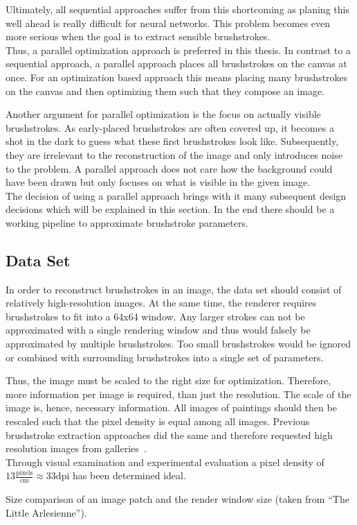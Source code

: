 Ultimately, all sequential approaches suffer from this shortcoming as planing this well ahead is really difficult for neural networks.
This problem becomes even more serious when the goal is to extract sensible brushstrokes.\\
Thus, a parallel optimization approach is preferred in this thesis.
In contrast to a sequential approach, a parallel approach places all brushstrokes on the canvas at once.
For an optimization based approach this means placing many brushstrokes on the canvas and then optimizing them such that they compose an image.

Another argument for parallel optimization is the focus on actually visible brushstrokes.
As early-placed brushstrokes are often covered up, it becomes a shot in the dark to guess what these first brushstrokes look like.
Subsequently, they are irrelevant to the reconstruction of the image and only introduces noise to the problem.
A parallel approach does not care how the background could have been drawn but only focuses on what is visible in the given image.\\

The decision of using a parallel approach brings with it many subsequent design decisions which will be explained in this section.
In the end there should be a working pipeline to approximate brushstroke parameters.

\subsection{Data Set}
In order to reconstruct brushstrokes in an image, the data set should consist of relatively high-resolution images.
At the same time, the renderer requires brushstrokes to fit into a 64x64 window.
Any larger strokes can not be approximated with a single rendering window and thus would falsely be approximated by multiple brushstrokes.
Too small brushstrokes would be ignored or combined with surrounding brushstrokes into a single set of parameters.

Thus, the image must be scaled to the right size for optimization.
Therefore, more information per image is required, than just the resolution.
The scale of the image is, hence, necessary information.
All images of paintings should then be rescaled such that the pixel density is equal among all images.
Previous brushstroke extraction approaches did the same and therefore requested high resolution images from galleries~\cite{rhythmic, lamberti}.\\
Through visual examination and experimental evaluation a pixel density of $13 \frac{\text{pixels}}{\si{\centi\meter}} \approx 33 \text{dpi}$ has been determined ideal.
\begin{marginfigure}
    \caption{Size comparison of an image patch and the render window size (taken from ``The Little Arlesienne'').}
\end{marginfigure}

